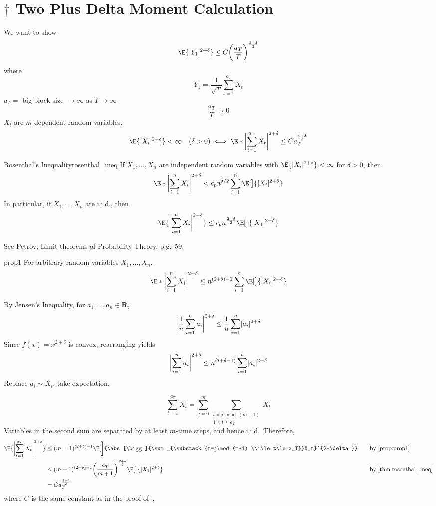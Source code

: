 \section{\texorpdfstring{$ \dagger $}{†} Two Plus Delta Moment Calculation}
We want to show
\[ \E{\abs{Y_1}^{2+\delta}}\le C\biggl(\frac{a_T}{T} \biggr)^{\frac{2+\delta}{2}} \]
where
\[ Y_1=\frac{1}{\sqrt{T}} \sum_{t=1}^{a_T} X_t \]
$ a_T= $ big block size $ \to\infty $ as $ T\to\infty $
\[ \frac{a_T}{T} \to 0 \]
$ X_t $ are $ m $-dependent random variables.
\[ \E{\abs{X_i}^{2+\delta}}<\infty\quad(\delta>0)\iff
    \E*{\abs[\bigg]{\sum_{t=1}^{a_T} X_t}^{2+\delta}}\le C a_T^{\frac{2+\delta}{2}} \]
\begin{Theorem}{Rosenthal's Inequality}{rosenthal_ineq}
    If $ X_1,\ldots,X_n $ are independent random variables
    with $ \E{\abs{X_i}^{2+\delta}}<\infty $ for $ \delta>0 $, then
    \[ \E*{\abs[\bigg]{\sum_{i=1}^{n} X_i}^{2+\delta}}<c_p n^{\delta/2}\sum_{i=1}^{n}
        \E[\big]{\abs{X_i}^{2+\delta}} \]
    In particular, if $ X_1,\ldots,X_n $ are i.i.d., then
    \[ \E{\abs[\bigg]{\sum_{i=1}^{n} X_i}^{2+\delta}}\le c_p n^{\frac{2+\delta}{2}}
        \E[\big]{\abs{X_1}^{2+\delta}} \]
\end{Theorem}
\begin{Proof}{}{}
    See Petrov, Limit theorems of Probability Theory, p.g.\ 59.
\end{Proof}
\begin{Proposition}{}{prop1}
    For arbitrary random variables $ X_1,\ldots,X_n $,
    \[ \E*{\abs[\bigg]{\sum_{i=1}^{n} X_i}^{2+\delta}}\le n^{(2+\delta)-1}
        \sum_{i=1}^{n}\E[\big]{\abs{X_i}^{2+\delta}} \]
\end{Proposition}
\begin{Proof}{}{}
    By Jensen's Inequality, for $ a_1,\ldots,a_n\in\mathbf{R} $,
    \[ \abs[\bigg]{\frac{1}{n} \sum_{i=1}^{n} a_i}^{2+\delta}\le \frac{1}{n} \sum_{i=1}^{n} \abs{a_i}^{2+\delta} \]
    Since $ f(x)=x^{2+\delta} $ is convex, rearranging yields
    \[ \abs[\bigg]{\sum_{i=1}^{n} a_i}^{2+\delta}\le
        n^{(2+\delta-1)}\sum_{i=1}^{n} \abs{a_i}^{2+\delta} \]
    Replace $ a_i\sim X_i $, take expectation.
\end{Proof}
\[ \sum_{t=1}^{a_T} X_t=\sum_{j=0}^{m}
    \sum_{\substack{t=j\mod (m+1)\\1\le t\le a_T}}X_t  \]
Variables in the second sum are separated by at least
$ m $-time steps, and hence i.i.d.\ Therefore,
\begin{align*}
    \E{\abs[\bigg]{\sum_{t=1}^{a_T} X_t}^{2+\delta}}
     & \le (m=1)^{(2+\delta)-1}
    \E[\bigg]{\abs[\bigg]{\sum_{\substack{t=j\mod (m+1)                                                                                                    \\1\le t\le a_T}}X_t}^{2+\delta}} & \quad & \text{by~\Cref{prop:prop1}}\\
     & \le (m+1)^{(2+\delta)-1}\biggl(\frac{a_T}{m+1} \biggr)^{\frac{2+\delta}{2} }\E[\big]{\abs{X_1}^{2+\delta}} &  & \text{by~\Cref{thm:rosenthal_ineq}} \\
     & =C a_T^{\frac{2+\delta}{2}}
\end{align*}
where $ C $ is the same constant as in the proof of~.


